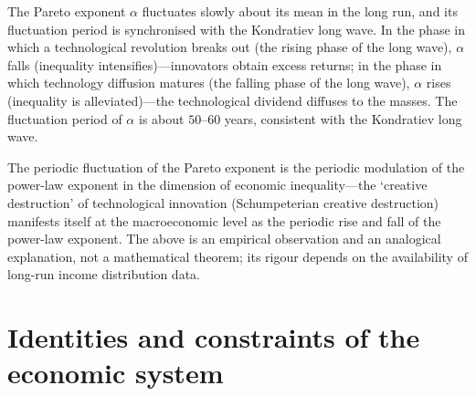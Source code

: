 \begin{remark}\label{prop:pareto_growth}
The Pareto exponent $\alpha$ fluctuates slowly about its mean in the long run, and its fluctuation period is synchronised with the Kondratiev long wave. In the phase in which a technological revolution breaks out (the rising phase of the long wave), $\alpha$ falls (inequality intensifies)---innovators obtain excess returns; in the phase in which technology diffusion matures (the falling phase of the long wave), $\alpha$ rises (inequality is alleviated)---the technological dividend diffuses to the masses. The fluctuation period of $\alpha$ is about $50$--$60$ years, consistent with the Kondratiev long wave.

The periodic fluctuation of the Pareto exponent is the periodic modulation of the power-law exponent in the dimension of economic inequality---the `creative destruction' of technological innovation (Schumpeterian creative destruction) manifests itself at the macroeconomic level as the periodic rise and fall of the power-law exponent. The above is an empirical observation and an analogical explanation, not a mathematical theorem; its rigour depends on the availability of long-run income distribution data.
\end{remark}

\section{Identities and constraints of the economic system}

